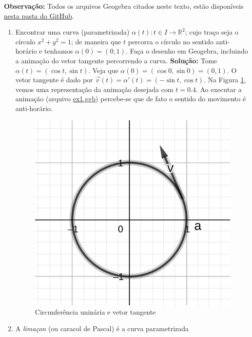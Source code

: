\documentclass[12pt,letterpaper]{article}
\begin{document}
	
	\large{\textbf{Observação:}} Todos os arquivos Geogebra citados neste texto, estão disponíveis \href{https://github.com/reneroliveira/Curves_and_Surfaces/tree/main/ggb_files}{nesta pasta do GitHub}.
\begin{enumerate}
	\item Encontrar uma curva (parametrizada) $\alpha(t) : t \in I \to \mathbb{R}^2$; cujo traço seja o círculo
	$x^2 + y^2 = 1$; de maneira que $t$ percorra o círculo no sentido anti-horário e tenhamos $\alpha (0) = (0, 1)$. Faça o desenho em Geogebra, incluindo a animação do vetor tangente percorrendo a curva.
	\subitem \textbf{Solução:} Tome $\alpha (t) = (\cos t,\sin t)$. Veja que $\alpha(0)=(\cos 0,\sin 0) = (0,1)$. O vetor tangente é dado por $\vec v(t)=\alpha '(t)=(-\sin t,\cos t)$. Na Figura \ref{ex1}, vemos uma representação da animação desejada com $t=0.4$. Ao executar a animação (arquivo \href{https://github.com/reneroliveira/Curves_and_Surfaces/tree/main/ggb_files}{ex1.ggb}) percebe-se que de fato o sentido do movimento é anti-horário.
	\begin{figure}[!htb]
		\centering
		\label{ex1}
		\includegraphics[scale=2]{../images/L1_ex1.png}
		\caption{Circunferência uninária e vetor tangente}
	\end{figure}
	
	\item A \emph{limaçon} (ou caracol de Pascal) é a curva parametrizada 
	

\end{enumerate}
\end{document}
